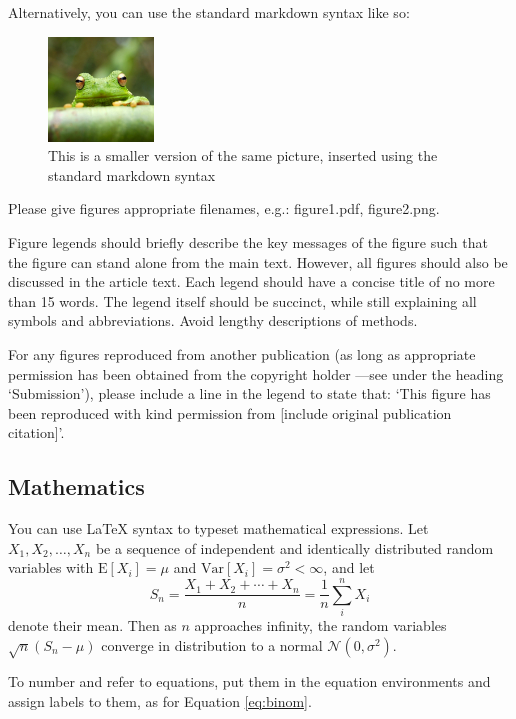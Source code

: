 \documentclass[9pt,a4paper,]{extarticle}
\theoremstyle{definition}
\theoremstyle{definition}
\theoremstyle{remark}
\begin{document}
Alternatively, you can use the standard markdown syntax like so:

\begin{figure}
\centering
\includegraphics[width=0.25000\textwidth]{frog.jpg}
\caption{This is a smaller version of the same picture, inserted using
the standard markdown syntax}
\end{figure}

Please give figures appropriate filenames, e.g.: figure1.pdf,
figure2.png.

Figure legends should briefly describe the key messages of the figure
such that the figure can stand alone from the main text. However, all
figures should also be discussed in the article text. Each legend should
have a concise title of no more than 15 words. The legend itself should
be succinct, while still explaining all symbols and abbreviations. Avoid
lengthy descriptions of methods.

For any figures reproduced from another publication (as long as
appropriate permission has been obtained from the copyright holder
---see under the heading `Submission'), please include a line in the
legend to state that: `This figure has been reproduced with kind
permission from {[}include original publication citation{]}'.

\subsection{Mathematics}\label{mathematics}

You can use LaTeX syntax to typeset mathematical expressions. Let
\(X_1, X_2, \ldots, X_n\) be a sequence of independent and identically
distributed random variables with \(\text{E}[X_i] = \mu\) and
\(\text{Var}[X_i] = \sigma^2 < \infty\), and let
\[S_n = \frac{X_1 + X_2 + \cdots + X_n}{n}
      = \frac{1}{n}\sum_{i}^{n} X_i\] denote their mean. Then as \(n\)
approaches infinity, the random variables \(\sqrt{n}(S_n - \mu)\)
converge in distribution to a normal \(\mathcal{N}(0, \sigma^2)\).

To number and refer to equations, put them in the equation environments
and assign labels to them, as for Equation \eqref{eq:binom}.
\end{document}
